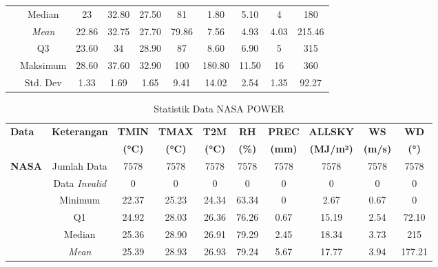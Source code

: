 \begin{enumerate}[(a)]
\begin{table}[H]
\begin{adjustbox}{max width=\textwidth}
\begin{tabular}{|l|c|c|c|c|c|c|c|c|c|}
            \cline{2-10}
            & Median & 23 & 32.80 & 27.50 & 81 & 1.80 & 5.10 & 4 & 180 \\
            \cline{2-10}
            & \textit{Mean} & 22.86 & 32.75 & 27.70 & 79.86 & 7.56 & 4.93 & 4.03 & 215.46 \\
            \cline{2-10}
            & Q3 & 23.60 & 34 & 28.90 & 87 & 8.60 & 6.90 & 5 & 315 \\
            \cline{2-10}
            & Maksimum & 28.60 & 37.60 & 32.90 & 100 & 180.80 & 11.50 & 16 & 360 \\
            \cline{2-10}
            & Std. Dev & 1.33 & 1.69 & 1.65 & 9.41 & 14.02 & 2.54 & 1.35 & 92.27 \\
            \hline
            \end{tabular}
            \end{adjustbox}
        \end{table}
        \begin{table}[H] 
            \centering
            \caption{Statistik Data NASA POWER}
            \label{tab:statistik_nasa}
            \begin{adjustbox}{max width=\textwidth}
            \small
            \begin{tabular}{|l|c|c|c|c|c|c|c|c|c|}
            \hline
            \textbf{Data} & \textbf{Keterangan} & \textbf{TMIN} & \textbf{TMAX} & \textbf{T2M} & \textbf{RH} & \textbf{PREC} & \textbf{ALLSKY} & \textbf{WS} & \textbf{WD} \\
            & & \textbf{(°C)} & \textbf{(°C)} & \textbf{(°C)} & \textbf{(\%)} & \textbf{(mm)} & \textbf{(MJ/m²)} & \textbf{(m/s)} & \textbf{(°)} \\
            \hline\hline
            \multirow{9}{*}{\textbf{NASA}} 
            & Jumlah Data & 7578 & 7578 & 7578 & 7578 & 7578 & 7578 & 7578 & 7578 \\
            \cline{2-10}
            & Data \textit{Invalid} & 0 & 0 & 0 & 0 & 0 & 0 & 0 & 0 \\
            \cline{2-10}
            & Minimum & 22.37 & 25.23 & 24.34 & 63.34 & 0 & 2.67 & 0.67 & 0 \\
            \cline{2-10}
            & Q1 & 24.92 & 28.03 & 26.36 & 76.26 & 0.67 & 15.19 & 2.54 & 72.10 \\
            \cline{2-10}
            & Median & 25.36 & 28.90 & 26.91 & 79.29 & 2.45 & 18.34 & 3.73 & 215 \\
            \cline{2-10}
            & \textit{Mean} & 25.39 & 28.93 & 26.93 & 79.24 & 5.67 & 17.77 & 3.94 & 177.21 \\

\end{tabular}
\end{adjustbox}
\end{table}
\end{enumerate}
